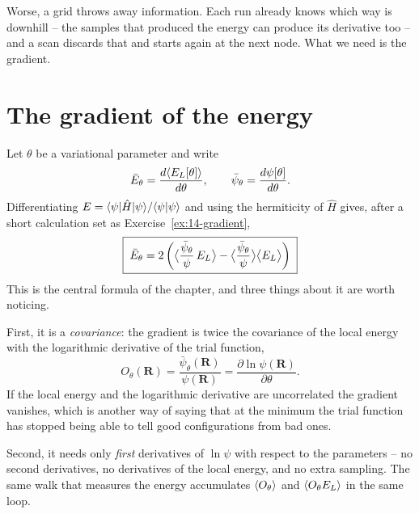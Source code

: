 Worse, a grid throws away information.  Each run already knows which way is
downhill -- the samples that produced the energy can produce its derivative
too -- and a scan discards that and starts again at the next node.  What we
need is the gradient.

\section{The gradient of the energy}
\label{sec:optgradient}

Let $\theta$ be a variational parameter and write
\begin{equation}
  \bar{E}_{\theta} = \frac{d\langle E_L[\theta] \rangle}{d\theta},
  \qquad
  \bar{\psi}_{\theta} = \frac{d\psi[\theta]}{d\theta} .
  \label{eq:14-definitions}
\end{equation}
Differentiating
$E=\langle \psi | \hat{H} | \psi \rangle/\langle \psi \vert \psi \rangle$ and using the
hermiticity of $\hat{H}$ gives, after a short calculation set as
Exercise~\ref{ex:14-gradient},
\begin{equation}
  \boxed{\;
  \bar{E}_{\theta}
   = 2\left(
     \big\langle \frac{\bar{\psi}_{\theta}}{\psi}\,E_L \big\rangle
     - \big\langle \frac{\bar{\psi}_{\theta}}{\psi} \big\rangle\big\langle E_L \big\rangle
     \right) \;}
  \label{eq:14-gradient}
\end{equation}
This is the central formula of the chapter, and three things about it are
worth noticing.

First, it is a \emph{covariance}: the gradient is twice the covariance of the
local energy with the logarithmic derivative of the trial function,
\begin{equation}
  O_{\theta}(\bm{R}) = \frac{\bar{\psi}_{\theta}(\bm{R})}{\psi(\bm{R})}
   = \frac{\partial\ln\psi(\bm{R})}{\partial\theta} .
  \label{eq:14-Otheta}
\end{equation}
If the local energy and the logarithmic derivative are uncorrelated the
gradient vanishes, which is another way of saying that at the minimum the
trial function has stopped being able to tell good configurations from bad
ones.

Second, it needs only \emph{first} derivatives of $\ln\psi$ with respect to
the parameters -- no second derivatives, no derivatives of the local energy,
and no extra sampling.  The same walk that measures the energy accumulates
$\langle O_\theta \rangle$ and $\langle O_\theta E_L \rangle$ in the same loop.

